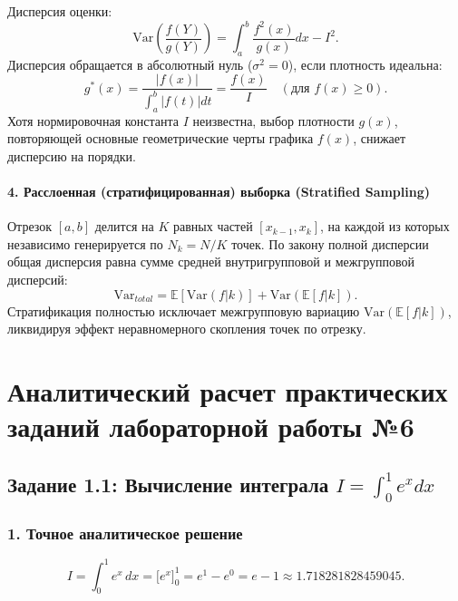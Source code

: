 \documentclass[11pt,a4paper]{article}
\begin{document}
Дисперсия оценки:
\begin{equation}
    \mathrm{Var}\left( \frac{f(Y)}{g(Y)} \right) = \int_{a}^{b} \frac{f^2(x)}{g(x)} dx - I^2.
\end{equation}
Дисперсия обращается в абсолютный нуль ($\sigma^2 = 0$), если плотность идеальна:
\begin{equation}
    g^*(x) = \frac{|f(x)|}{\int_a^b |f(t)| dt} = \frac{f(x)}{I} \quad (\text{для } f(x) \ge 0).
\end{equation}
Хотя нормировочная константа $I$ неизвестна, выбор плотности $g(x)$, повторяющей основные геометрические черты графика $f(x)$, снижает дисперсию на порядки.

\paragraph{4. Расслоенная (стратифицированная) выборка (Stratified Sampling)}
Отрезок $[a,b]$ делится на $K$ равных частей $[x_{k-1}, x_k]$, на каждой из которых независимо генерируется по $N_k = N/K$ точек. По закону полной дисперсии общая дисперсия равна сумме средней внутригрупповой и межгрупповой дисперсий:
\begin{equation}
    \mathrm{Var}_{total} = \mathbb{E}[\mathrm{Var}(f|k)] + \mathrm{Var}(\mathbb{E}[f|k]).
\end{equation}
Стратификация полностью исключает межгрупповую вариацию $\mathrm{Var}(\mathbb{E}[f|k])$, ликвидируя эффект неравномерного скопления точек по отрезку.

\newpage

\section{Аналитический расчет практических заданий лабораторной работы №6}

\subsection{Задание 1.1: Вычисление интеграла $I = \int_0^1 e^x dx$}

\subsubsection{1. Точное аналитическое решение}
\begin{equation}
    I = \int_{0}^{1} e^x\,dx = \Big[ e^x \Big]_0^1 = e^1 - e^0 = e - 1 \approx 1.718281828459045.
\end{equation}
\end{document}
